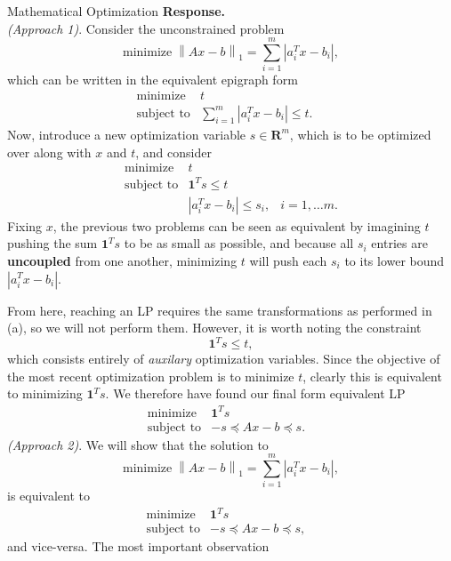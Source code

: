 \begin{chapter}{Mathematical Optimization}
    \vspace{0.1cm}
    \noindent \textbf{Response.}  \\
    \noindent \textit{(Approach 1)}. 
    Consider the unconstrained problem
    \[\text{minimize} \; \left\lVert Ax - b \right\rVert_{1} = \sum_{i=1}^{m}\left| a_i^Tx - b_i \right|,\]
    which can be written in the equivalent epigraph form
    \[
        \begin{array}{lll}
        \text{minimize} \; & t & \\
        \text{subject to} & \sum_{i=1}^{m}\left| a_i^Tx - b_i \right| \le t. \; &  
        \end{array}
    \]
    Now, introduce a new optimization variable $s \in \mathbf{R}^m$, which is to be optimized over
    along with $x$ and $t$,
    and consider 
    \[
        \begin{array}{lll}
        \text{minimize} \; & t & \\
        \text{subject to} & \bm{1}^Ts \le t \; &  \\
        & \left| a_i^Tx - b_i \right| \le s_i, & i = 1, \ldots m.
        \end{array}
    \]
    Fixing $x$, the previous two problems can be seen as equivalent by imagining $t$ pushing 
    the sum $\bm{1}^Ts$ to be as small as possible, and because all $s_i$ entries are \textbf{uncoupled}
    from one another, minimizing $t$ will push each $s_i$ to its lower bound $\left| a_i^Tx - b_i \right|$.

    From here, reaching an LP requires the same transformations as performed in (a), so we will not perform them. However,
    it is worth noting the constraint
    \[\bm{1}^Ts \le t,\]
    which consists entirely of \textit{auxilary} optimization variables. Since the objective of 
    the most recent optimization problem is to minimize $t$, clearly this is equivalent to minimizing $\bm{1}^Ts$.
    We therefore have found our final form equivalent LP
    \[
        \begin{array}{lll}
        \text{minimize} \; & \bm{1}^Ts & \\
        \text{subject to} & -s \preceq Ax - b \preceq s. &
        \end{array}
    \]
    \noindent \textit{(Approach 2)}. We will show that the solution to
    \[\text{minimize} \; \left\lVert Ax - b \right\rVert_{1} = \sum_{i=1}^{m}\left| a_i^Tx - b_i \right|,\]
    is equivalent to
    \[
        \begin{array}{lll}
        \text{minimize} \; & \bm{1}^Ts & \\
        \text{subject to} & -s \preceq Ax - b \preceq s, &
        \end{array}
    \]
    and vice-versa.
    The most important observation

\end{chapter}